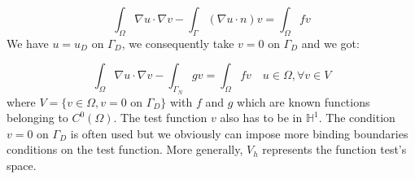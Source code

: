 \begin{equation*}
\int_\Omega \nabla u\cdot \nabla v - \int_\Gamma (\nabla u \cdot n)v = \int_\Omega f v
\end{equation*}
We have $u=u_D $ on $\Gamma_D$, we consequently take $v=0$ on $\Gamma_D$ and we got:

\begin{equation*}
\int_\Omega \nabla u\cdot\nabla v - \int_{\Gamma_N} gv = \int_\Omega f v \quad u\in\varOmega,  \forall v \in V
\end{equation*}
where $V=\{ v\in\varOmega, v = 0$ on $ \Gamma_D\}$ with $f$ and $g$ which are known functions belonging to $C^0(\varOmega)$. The test function $v$ also has to be in $\mathbb{H}^1$. The condition $v=0$ on $\Gamma_D$ is often used but we obviously can impose more binding boundaries conditions on the test function.
More generally, $V_h$ represents the function test's space.




